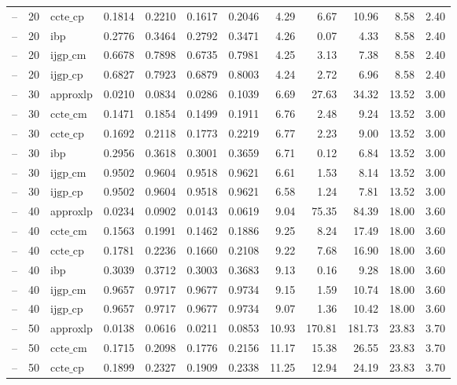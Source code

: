 \begin{table}[ht]
\begin{tabular}{lrlrrrrrrrrr}
-- & 20 & $\text{ccte\_cp}$ & 0.1814 & 0.2210 & 0.1617 & 0.2046 & 4.29 & 6.67 & 10.96 & 8.58 & 2.40 \\
-- & 20 & ibp & 0.2776 & 0.3464 & 0.2792 & 0.3471 & 4.26 & 0.07 & 4.33 & 8.58 & 2.40 \\
-- & 20 & $\text{ijgp\_cm}$ & 0.6678 & 0.7898 & 0.6735 & 0.7981 & 4.25 & 3.13 & 7.38 & 8.58 & 2.40 \\
-- & 20 & $\text{ijgp\_cp}$ & 0.6827 & 0.7923 & 0.6879 & 0.8003 & 4.24 & 2.72 & 6.96 & 8.58 & 2.40 \\
-- & 30 & approxlp & 0.0210 & 0.0834 & 0.0286 & 0.1039 & 6.69 & 27.63 & 34.32 & 13.52 & 3.00 \\
-- & 30 & $\text{ccte\_cm}$ & 0.1471 & 0.1854 & 0.1499 & 0.1911 & 6.76 & 2.48 & 9.24 & 13.52 & 3.00 \\
-- & 30 & $\text{ccte\_cp}$ & 0.1692 & 0.2118 & 0.1773 & 0.2219 & 6.77 & 2.23 & 9.00 & 13.52 & 3.00 \\
-- & 30 & ibp & 0.2956 & 0.3618 & 0.3001 & 0.3659 & 6.71 & 0.12 & 6.84 & 13.52 & 3.00 \\
-- & 30 & $\text{ijgp\_cm}$ & 0.9502 & 0.9604 & 0.9518 & 0.9621 & 6.61 & 1.53 & 8.14 & 13.52 & 3.00 \\
-- & 30 & $\text{ijgp\_cp}$ & 0.9502 & 0.9604 & 0.9518 & 0.9621 & 6.58 & 1.24 & 7.81 & 13.52 & 3.00 \\
-- & 40 & approxlp & 0.0234 & 0.0902 & 0.0143 & 0.0619 & 9.04 & 75.35 & 84.39 & 18.00 & 3.60 \\
-- & 40 & $\text{ccte\_cm}$ & 0.1563 & 0.1991 & 0.1462 & 0.1886 & 9.25 & 8.24 & 17.49 & 18.00 & 3.60 \\
-- & 40 & $\text{ccte\_cp}$ & 0.1781 & 0.2236 & 0.1660 & 0.2108 & 9.22 & 7.68 & 16.90 & 18.00 & 3.60 \\
-- & 40 & ibp & 0.3039 & 0.3712 & 0.3003 & 0.3683 & 9.13 & 0.16 & 9.28 & 18.00 & 3.60 \\
-- & 40 & $\text{ijgp\_cm}$ & 0.9657 & 0.9717 & 0.9677 & 0.9734 & 9.15 & 1.59 & 10.74 & 18.00 & 3.60 \\
-- & 40 & $\text{ijgp\_cp}$ & 0.9657 & 0.9717 & 0.9677 & 0.9734 & 9.07 & 1.36 & 10.42 & 18.00 & 3.60 \\
-- & 50 & approxlp & 0.0138 & 0.0616 & 0.0211 & 0.0853 & 10.93 & 170.81 & 181.73 & 23.83 & 3.70 \\
-- & 50 & $\text{ccte\_cm}$ & 0.1715 & 0.2098 & 0.1776 & 0.2156 & 11.17 & 15.38 & 26.55 & 23.83 & 3.70 \\
-- & 50 & $\text{ccte\_cp}$ & 0.1899 & 0.2327 & 0.1909 & 0.2338 & 11.25 & 12.94 & 24.19 & 23.83 & 3.70 \\

\end{tabular}
\end{table}

